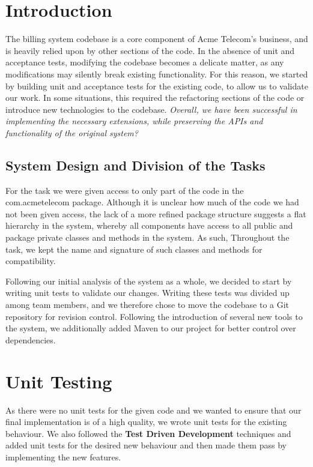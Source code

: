 \documentclass[a4paper]{article}
\begin{document}
\section{Introduction}
The billing system codebase is a core component of Acme Telecom's business, and is heavily relied upon by other sections of the code. In the absence of unit and acceptance tests, modifying the codebase becomes a delicate matter, as any modifications may silently break existing functionality. For this reason, we started by building unit and acceptance tests for the existing code, to allow us to validate our work. In some situations, this required the refactoring sections of the code or introduce new technologies to the codebase. \emph{Overall, we have been successful in implementing the necessary extensions, while preserving the APIs and functionality of the original system?}

\subsection{System Design and Division of the Tasks}
For the task we were given access to only part of the code in the com.acmetelecom package. Although it is unclear how much of the code we had not been given access, the lack of a more refined package structure suggests a flat hierarchy in the system, whereby all components have access to all public and package private classes and methods in the system. As such, Throughout the task, we kept the name and signature of such classes and methods for compatibility.

Following our initial analysis of the system as a whole, we decided to start by writing unit tests to validate our changes. Writing these tests was divided up among team members, and we therefore chose to move the codebase to a Git repository for revision control. Following the introduction of several new tools to the system, we additionally added Maven to our project for better control over dependencies.

\section{Unit Testing}
As there were no unit tests for the given code and we wanted to ensure that our final implementation is of a high quality, we wrote unit tests for the existing behaviour. We also followed the {\bf Test Driven Development} techniques and added unit tests for the desired new behaviour and then made them pass by implementing the new features.
\end{document}

